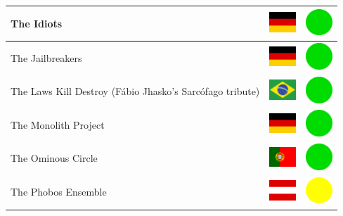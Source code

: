 \documentclass[12pt, a4paper, twoside]{report}
\begin{document}
\begin{center}
\begin{longtable}{|p{5cm}|p{2cm}|p{2cm}|}
			The Idiots & \includegraphics[width=1cm]{4x3/de} & \includegraphics[width=1cm]{likes/y} \\ \hline
			The Jailbreakers & \includegraphics[width=1cm]{4x3/de} & \includegraphics[width=1cm]{likes/y} \\ \hline
			The Laws Kill Destroy (Fábio Jhasko's Sarcófago tribute) & \includegraphics[width=1cm]{4x3/br} & \includegraphics[width=1cm]{likes/y} \\ \hline
			The Monolith Project & \includegraphics[width=1cm]{4x3/de} & \includegraphics[width=1cm]{likes/y} \\ \hline
			The Ominous Circle & \includegraphics[width=1cm]{4x3/pt} & \includegraphics[width=1cm]{likes/y} \\ \hline
			The Phobos Ensemble & \includegraphics[width=1cm]{4x3/at} & \includegraphics[width=1cm]{likes/m} \\ \hline

\end{longtable}
\end{center}
\end{document}

